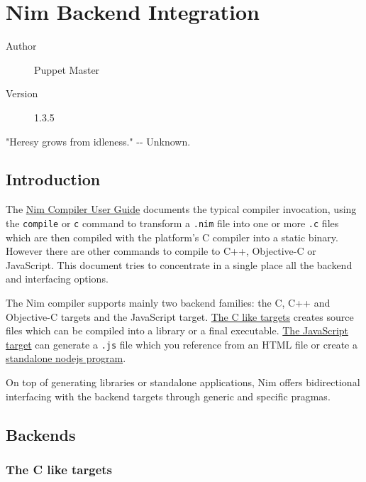 \hypertarget{nim-backend-integration}{%
\section{Nim Backend Integration}\label{nim-backend-integration}}

\begin{description}
\item[Author]
Puppet Master
\item[Version]
1.3.5
\end{description}

"Heresy grows from idleness." -\/- Unknown.

\hypertarget{introduction}{%
\subsection{Introduction}\label{introduction}}

The \href{nimc.html}{Nim Compiler User Guide} documents the typical
compiler invocation, using the \texttt{compile} or \texttt{c} command to
transform a \texttt{.nim} file into one or more \texttt{.c} files which
are then compiled with the platform's C compiler into a static binary.
However there are other commands to compile to C++, Objective-C or
JavaScript. This document tries to concentrate in a single place all the
backend and interfacing options.

The Nim compiler supports mainly two backend families: the C, C++ and
Objective-C targets and the JavaScript target.
\protect\hyperlink{backends-the-c-like-targets}{The C like targets}
creates source files which can be compiled into a library or a final
executable. \protect\hyperlink{backends-the-javascript-target}{The
JavaScript target} can generate a \texttt{.js} file which you reference
from an HTML file or create a \href{http://nodejs.org}{standalone nodejs
program}.

On top of generating libraries or standalone applications, Nim offers
bidirectional interfacing with the backend targets through generic and
specific pragmas.

\hypertarget{backends}{%
\subsection{Backends}\label{backends}}

\hypertarget{the-c-like-targets}{%
\subsubsection{The C like targets}\label{the-c-like-targets}}

